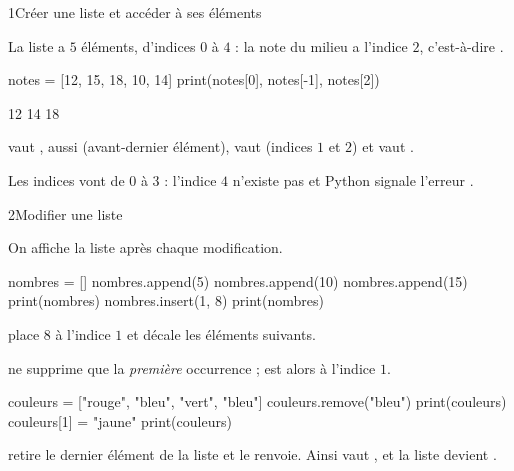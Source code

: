 
\corrigesSouples

\begin{corrige}{1}{Créer une liste et accéder à ses éléments}
\begin{questions}
  \item La liste a $5$ éléments, d'indices $0$ à $4$ : la note du milieu a l'indice $2$, c'est-à-dire .
\begin{codecote}[0.58]
\begin{pythoncol}
notes = [12, 15, 18, 10, 14]
print(notes[0], notes[-1], notes[2])
\end{pythoncol}
\cote
\begin{consolecol}
12 14 18
\end{consolecol}
\end{codecote}
  \item {} vaut ,  aussi (avant-dernier élément),  vaut
     (indices $1$ et $2$) et  vaut .
  \item Les indices vont de $0$ à $3$ : l'indice $4$ n'existe pas et Python signale l'erreur .
\end{questions}
\end{corrige}

\begin{corrige}{2}{Modifier une liste}
\begin{questions}
  \item On affiche la liste après chaque modification.
\begin{codecote}[0.5]
\begin{pythoncol}
nombres = []
nombres.append(5)
nombres.append(10)
nombres.append(15)
print(nombres)
nombres.insert(1, 8)
print(nombres)
\end{pythoncol}
\cote
\begin{consolecol}
[5, 10, 15]
[5, 8, 10, 15]
\end{consolecol}

\medskip
{} place $8$ à l'indice $1$ et décale les éléments suivants.
\end{codecote}
  \item {} ne supprime que la \emph{première} occurrence ;  est alors à l'indice $1$.
\begin{python}
couleurs = ["rouge", "bleu", "vert", "bleu"]
couleurs.remove("bleu")
print(couleurs)
couleurs[1] = "jaune"
print(couleurs)
\end{python}
\begin{console}
\end{console}
  \item {} retire le dernier élément de la liste et le renvoie. Ainsi  vaut , et la liste
     devient .
\end{questions}
\end{corrige}

